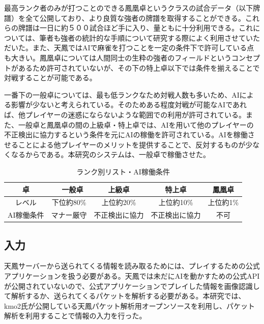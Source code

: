 最高ランク者のみが打つことのできる鳳凰卓というクラスの試合データ（以下牌譜）を全て公開しており、より良質な強者の牌譜を取得することができる。これらの牌譜は一日に約５００試合ほど手に入り、量ともに十分利用できる。これについては、筆者も強者の統計的な手順について研究する際によく利用させていただいた。また、天鳳ではAIで麻雀を打つことを一定の条件下で許可している点も大きい。鳳凰卓については人間同士の生粋の強者のフィールドというコンセプトがあるため許可されていないが、その下の特上卓以下では条件を揃えることで対戦することが可能である。

一番下の一般卓については、最も低ランクなため対戦人数も多いため、AIによる影響が少ないと考えられている。そのためある程度対戦が可能なAIであれば、他プレイヤーの迷惑にならないような範囲での利用が許可されている。また、一般卓と鳳凰卓の間の上級卓・特上卓では、AIを用いて他のプレイヤーの不正検出に協力するという条件を元にAIの稼働を許可されている。AIを稼働させることによる他プレイヤーのメリットを提供することで、反対するものが少なくなるからである。本研究のシステムは、一般卓で稼働させた。

\begin{table}[h]
  \caption{ランク別リスト・AI稼働条件}
  \label{tb:rate2231}
  \begin{center}
  \begin{tabular}{c|c|c|c|c}
    \hline
    卓　&　一般卓   & 上級卓 & 特上卓 & 鳳凰卓\\\hline\hline
    レベル & 下位約80\% & 上位約20\% & 上位約10\% & 上位約1\% \\\hline
    AI稼働条件 & マナー厳守 & 不正検出に協力 & 不正検出に協力 & 不可\\\hline
  \end{tabular}\end{center}
\end{table}


\subsection{入力}
天鳳サーバーから送られてくる情報を読み取るためには、プレイするための公式アプリケーションを扱う必要がある。天鳳では未だにAIを動かすための公式APIが公開されていないので、公式アプリケーションでプレイした情報を画像認識して解析するか、送られてくるパケットを解析する必要がある。本研究では、kmo2氏が公開している天鳳パケット解析用オープンソース\cite{kmo2}を利用し、パケット解析を利用することで情報の入力を行った。

